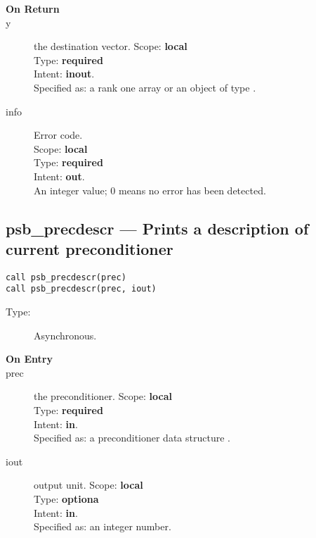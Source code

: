 \begin{description}
\item[\bf On Return]
\item[y] the destination vector.
Scope: {\bf local} \\
Type: {\bf required}\\
Intent: {\bf inout}.\\
Specified as:  a rank one array or an object of type \vdata.
\item[info] Error code.\\
Scope: {\bf local} \\
Type: {\bf required} \\
Intent: {\bf out}.\\
An integer value; 0 means no error has been detected. 
\end{description}



\clearpage\subsection*{psb\_precdescr --- Prints a description of current
  preconditioner}

\begin{verbatim}
call psb_precdescr(prec)
call psb_precdescr(prec, iout)
\end{verbatim}

\begin{description}
\item[Type:] Asynchronous.
\item[\bf On Entry]
\item[prec] the preconditioner.
Scope: {\bf local} \\
Type: {\bf required}\\
Intent: {\bf in}.\\
Specified as: a preconditioner data structure \precdata.
\item[iout] output unit.
Scope: {\bf local} \\
Type: {\bf optiona}\\
Intent: {\bf in}.\\
Specified as: an integer number. 
\end{description}



